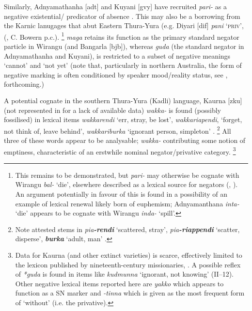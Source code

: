 \documentclass[output=paper,draft,draftmode,colorlinks,citecolor=brown]{langscibook}
\begin{document}
Similarly, Adnyamathanha [adt] and Kuyani
    [gvy] have recruited \textit{pari-} as a negative existential\slash
    predicator of absence \citep[141]{Hercus1999}. This may also be a
    borrowing from the Karnic lanugages that abut Eastern Thura-Yura (e.g.
    Diyari [dif] \textit{pani} \textsc{`priv'}, (\citealt{Austin2011}, C.
    Bowern p.c.).%
%
\footnote{This remains to be demonstrated, but
    \textit{pari-} may otherwise be cognate with Wirangu \textit{bal-}
    `die', elsewhere described as a lexical source for negators
    (\citealt{Veselinova2013}, ). An argument
    potentially in favour of this is found in a possibility of an example
    of lexical renewal likely born of euphemism; Adnyamanthana
    \textit{inta-} `die' appears to be cognate with Wirangu \textit{inda-}
    `spill'.}
%
\textit{maga} retains its function as the primary standard negator particle
    in Wirangu (and Bangarla [bjb]),  whereas
    \textit{guda} (the standard negator in Adnyamathanha
    and Kuyani), is restricted to a subset of negative meanings `cannot' and `not yet' (note that, particularly in northern Australia, the form of negative marking is often conditioned by speaker mood\slash reality status, see \citealt[225]{Miestamo2005}, \citeauthor{PhillipsFCb} forthcoming.)

    A potential cognate in the southern Thura-Yura (Kadli) language,
Kaurna [zku] (not represented in  for a lack of
    available data) \textit{wakka-} is found (possibly fossilised) in
    lexical items \textit{wakkarendi} `err, stray, be lost',
    \textit{wakkariapendi}, `forget, not think of, leave behind',
    \textit{wakkariburka} `ignorant person, simpleton'
    \citep[II--52]{SchurmannTeichelmann1840}.%
\footnote{Note attested stems in \textit{pia\textbf{-rendi}} `scattered,
    stray', \textit{pia\textbf{-riappendi}} `scatter, disperse',
    \textit{\textbf{burka}} `adult, man'
    \citep[II--4,38]{SchurmannTeichelmann1840}.} 
All three of these words appear to be analysable; \textit{wakka-}
contributing some notion of emptiness, characteristic of an erstwhile
nominal negator\slash privative category.%
%
\footnote{Data for Kaurna (and other extinct varieties) is
scarce, effectively limited to the lexicon published by nineteenth-century
missionaries, \citet{SchurmannTeichelmann1840}. A possible reflex of
\textit{*guda} is found in items like \textit{kudmunna} `ignorant, not
knowing' (II--12).  Other negative lexical items reported here are
\textit{yakko} which appears to function as a SN marker and \textit{-tinna}
which is given as the most frequent form of `without' (i.e. the
privative).}
\end{document}
